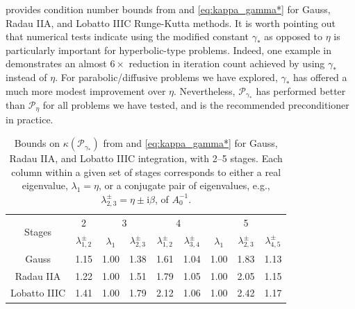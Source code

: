 \documentclass[review]{siamart}
\begin{document}
 provides condition number bounds from  and
\eqref{eq:kappa_gamma*} for Gauss, Radau IIA, and Lobatto IIIC Runge-Kutta methods.
It is worth pointing out that numerical tests indicate using the modified constant
$\gamma_*$ as opposed to $\eta$ is particularly important for hyperbolic-type
problems. Indeed, one example in  demonstrates an almost
$6\times$ reduction in iteration count achieved by using $\gamma_*$ instead of
$\eta$. For parabolic/diffusive problems we have explored, $\gamma_*$ has offered
a much more modest improvement over $\eta$. Nevertheless, $\mathcal{P}_{\gamma_*}$
has performed better than $\mathcal{P}_{\eta}$ for all problems we have tested,
and is the recommended preconditioner in practice.
%
{
\renewcommand{\arraystretch}{1.15}
\begin{table}[!ht]
  \centering
  \begin{tabular}{| c | c | cc | cc | ccc |}  %
  \hline
\multirow{2}{*}{Stages} & 2 & \multicolumn{2}{c}{3} & \multicolumn{2}{|c}{4} & \multicolumn{3}{|c|}{5} \\

& {$\lambda_{1,2}^\pm$} & {$\lambda_1$} & {$\lambda_{2,3}^\pm$} & {$\lambda_{1,2}^\pm$} &
	{$\lambda_{3,4}^\pm$} & {$\lambda_1$} & {$\lambda_{2,3}^\pm$} & {$\lambda_{4,5}^\pm$} \\
\hline
Gauss & 1.15 & 1.00 & 1.38 & 1.61 & 1.04 & 1.00 & 1.83 & 1.13 \\
Radau IIA & 1.22 & 1.00 & 1.51 & 1.79 & 1.05 & 1.00 & 2.05 & 1.15 \\
Lobatto IIIC & 1.41 & 1.00 & 1.79 & 2.12 & 1.06 & 1.00 & 2.42 & 1.17 \\\hline
  \end{tabular}
  \caption{Bounds on $\kappa(\mathcal{P}_{\gamma_*})$ from  and
  \eqref{eq:kappa_gamma*} for Gauss, Radau IIA, and Lobatto IIIC integration,
  with 2--5 stages. Each column within a given set of stages corresponds
  to either a real eigenvalue, $\lambda_1 = \eta$, or a conjugate pair of eigenvalues,
  e.g., $\lambda_{2,3}^\pm = \eta \pm \mathrm{i}\beta$, of
  $A_0^{-1}$.}\label{tab:cond}
\end{table}
\vspace{-3ex}
}
\end{document}
